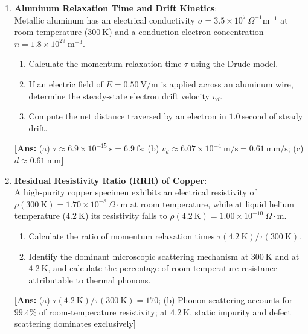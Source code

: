 \documentclass[11pt,a4paper]{article}
\begin{document}
\begin{enumerate}[label=\textbf{\arabic*.}, leftmargin=*]
    \item \textbf{Aluminum Relaxation Time and Drift Kinetics}:\\
    Metallic aluminum has an electrical conductivity $\sigma = 3.5 \times 10^7\ \Omega^{-1}\mathrm{m}^{-1}$ at room temperature ($300\ \mathrm{K}$) and a conduction electron concentration $n = 1.8 \times 10^{29}\ \mathrm{m}^{-3}$.
    \begin{enumerate}[label=(\alph*)]
        \item Calculate the momentum relaxation time $\tau$ using the Drude model.
        \item If an electric field of $E = 0.50\ \mathrm{V/m}$ is applied across an aluminum wire, determine the steady-state electron drift velocity $v_d$.
        \item Compute the net distance traversed by an electron in $1.0\ \mathrm{second}$ of steady drift.
    \end{enumerate}
    \textbf{[Ans:} (a) $\tau \approx 6.9 \times 10^{-15}\ \mathrm{s} = 6.9\ \mathrm{fs}$; (b) $v_d \approx 6.07 \times 10^{-4}\ \mathrm{m/s} = 0.61\ \mathrm{mm/s}$; (c) $d \approx 0.61\ \mathrm{mm}$\textbf{]}

    \item \textbf{Residual Resistivity Ratio (RRR) of Copper}:\\
    A high-purity copper specimen exhibits an electrical resistivity of $\rho(300\ \mathrm{K}) = 1.70 \times 10^{-8}\ \Omega\cdot\mathrm{m}$ at room temperature, while at liquid helium temperature ($4.2\ \mathrm{K}$) its resistivity falls to $\rho(4.2\ \mathrm{K}) = 1.00 \times 10^{-10}\ \Omega\cdot\mathrm{m}$.
    \begin{enumerate}[label=(\alph*)]
        \item Calculate the ratio of momentum relaxation times $\tau(4.2\ \mathrm{K}) / \tau(300\ \mathrm{K})$.
        \item Identify the dominant microscopic scattering mechanism at $300\ \mathrm{K}$ and at $4.2\ \mathrm{K}$, and calculate the percentage of room-temperature resistance attributable to thermal phonons.
    \end{enumerate}
    \textbf{[Ans:} (a) $\tau(4.2\ \mathrm{K})/\tau(300\ \mathrm{K}) = 170$; (b) Phonon scattering accounts for $99.4\%$ of room-temperature resistivity; at $4.2\ \mathrm{K}$, static impurity and defect scattering dominates exclusively\textbf{]}


\end{enumerate}
\end{document}
